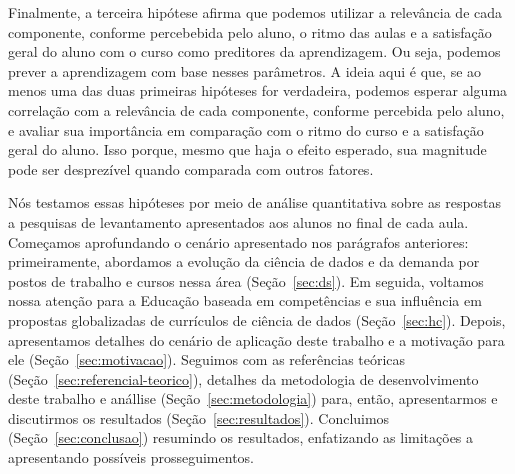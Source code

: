 Finalmente, a terceira hipótese afirma que podemos utilizar a relevância de cada componente, conforme percebebida pelo aluno, o ritmo das aulas e a satisfação geral do aluno com o curso como preditores da aprendizagem.
Ou seja, podemos prever a aprendizagem com base nesses parâmetros.
A ideia aqui é que, se ao menos uma das duas primeiras hipóteses for verdadeira, podemos esperar alguma correlação com a relevância de cada componente, conforme percebida pelo aluno, e avaliar sua importância em comparação com o ritmo do curso e a satisfação geral do aluno.
Isso porque, mesmo que haja o efeito esperado, sua magnitude pode ser desprezível quando comparada com outros fatores.

Nós testamos essas hipóteses por meio de análise quantitativa sobre as respostas a pesquisas de levantamento apresentados aos alunos no final de cada aula.
Começamos aprofundando o cenário apresentado nos parágrafos anteriores: primeiramente, abordamos a evolução da ciência de dados e da demanda por postos de trabalho e cursos nessa área (Seção~\ref{sec:ds}).
Em seguida, voltamos nossa atenção para a Educação baseada em competências e sua influência em propostas globalizadas de currículos de ciência de dados (Seção~\ref{sec:hc}).
Depois, apresentamos detalhes do cenário de aplicação deste trabalho e a motivação para ele (Seção~\ref{sec:motivacao}).
Seguimos com as referências teóricas (Seção~\ref{sec:referencial-teorico}), detalhes da metodologia de desenvolvimento deste trabalho e anállise (Seção~\ref{sec:metodologia}) para, então, apresentarmos e discutirmos os resultados (Seção~\ref{sec:resultados}).
Concluimos (Seção~\ref{sec:conclusao}) resumindo os resultados, enfatizando as limitações a apresentando possíveis prosseguimentos.